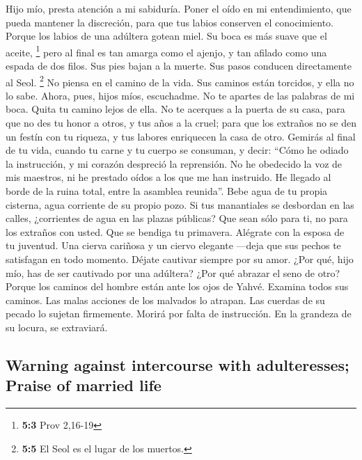 \begin{paracol}{2}
 Hijo mío, presta atención a mi sabiduría. Poner el oído
en mi entendimiento,  que pueda mantener la discreción,
para que tus labios conserven el conocimiento.  Porque los
labios de una adúltera gotean miel. Su boca es más suave que el aceite,
\footnote{\textbf{5:3} Prov 2,16-19}  pero al final es tan
amarga como el ajenjo, y tan afilado como una espada de dos filos.
 Sus pies bajan a la muerte. Sus pasos conducen
directamente al Seol. \footnote{\textbf{5:5} El Seol es el lugar de los
  muertos.}  No piensa en el camino de la vida. Sus
caminos están torcidos, y ella no lo sabe.  Ahora, pues,
hijos míos, escuchadme. No te apartes de las palabras de mi boca.
 Quita tu camino lejos de ella. No te acerques a la puerta
de su casa,  para que no des tu honor a otros, y tus años
a la cruel;  para que los extraños no se den un festín
con tu riqueza, y tus labores enriquecen la casa de otro.
 Gemirás al final de tu vida, cuando tu carne y tu cuerpo
se consuman,  y decir: ``Cómo he odiado la instrucción, y
mi corazón despreció la reprensión.  No he obedecido la
voz de mis maestros, ni he prestado oídos a los que me han instruido.
 He llegado al borde de la ruina total, entre la asamblea
reunida''.  Bebe agua de tu propia cisterna, agua
corriente de su propio pozo.  Si tus manantiales se
desbordan en las calles, ¿corrientes de agua en las plazas públicas?
 Que sean sólo para ti, no para los extraños con usted.
 Que se bendiga tu primavera. Alégrate con la esposa de
tu juventud.  Una cierva cariñosa y un ciervo elegante
---deja que sus pechos te satisfagan en todo momento. Déjate cautivar
siempre por su amor.  ¿Por qué, hijo mío, has de ser
cautivado por una adúltera? ¿Por qué abrazar el seno de otro?
 Porque los caminos del hombre están ante los ojos de
Yahvé. Examina todos sus caminos.  Las malas acciones de
los malvados lo atrapan. Las cuerdas de su pecado lo sujetan firmemente.
 Morirá por falta de instrucción. En la grandeza de su
locura, se extraviará.

\switchcolumn
\begin{otherlanguage}{english}

\hypertarget{warning-against-intercourse-with-adulteresses-praise-of-married-life}{%
\subsection{Warning against intercourse with adulteresses; Praise of
married
life}\label{warning-against-intercourse-with-adulteresses-praise-of-married-life}}


\end{otherlanguage}
\end{paracol}
